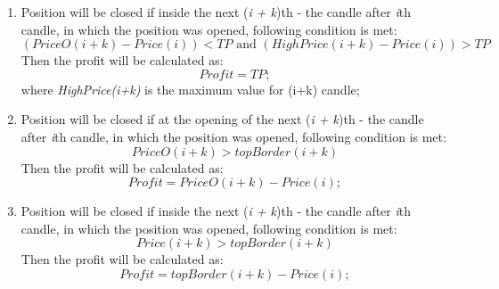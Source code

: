 \documentclass{tewiart}
\begin{document}
\begin{enumerate}
\item Position will be closed if inside the next (\textit{i + k})th - the candle after \textit{i}th candle, in which the position was opened, following condition is met: 
\begin{equation}
(PriceO(i+k)-Price(i) )<TP \text{ and } (HighPrice(i+k)-Price(i))>TP
\end{equation} 
Then the profit will be calculated as:
\begin{equation}
Profit =TP;
\end{equation}
where \textit{HighPrice(i+k)} is the maximum value for (i+k) candle;

\item Position will be closed if at the opening of the next (\textit{i + k})th - the candle after \textit{i}th candle, in which the position was opened, following condition is met: 
\begin{equation}
PriceO(i+k) >topBorder(i+k)
\end{equation} 
Then the profit will be calculated as:
\begin{equation}
Profit =PriceO (i+k) -  Price(i) ;
\end{equation}

\item Position will be closed if inside the next (\textit{i + k})th - the candle after \textit{i}th candle, in which the position was opened, following condition is met: 
\begin{equation}
Price(i+k) >topBorder(i+k)
\end{equation} 
Then the profit will be calculated as:
\begin{equation}
Profit =topBorder (i+k) -  Price(i) ;
\end{equation}

\end{enumerate}
\end{document}
